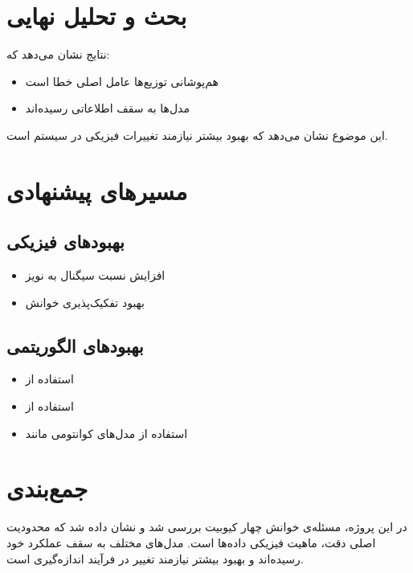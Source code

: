 \section{بحث و تحلیل نهایی}

نتایج نشان می‌دهد که:
\begin{itemize}
	\item هم‌پوشانی توزیع‌ها عامل اصلی خطا است
	\item مدل‌ها به سقف اطلاعاتی رسیده‌اند
\end{itemize}

این موضوع نشان می‌دهد که بهبود بیشتر نیازمند تغییرات فیزیکی در سیستم است.

\section{مسیرهای پیشنهادی}

\subsection{بهبودهای فیزیکی}
\begin{itemize}
	\item افزایش نسبت سیگنال به نویز
	\item بهبود تفکیک‌پذیری خوانش
\end{itemize}

\subsection{بهبودهای الگوریتمی}
\begin{itemize}
	\item استفاده از 
	\item استفاده از 
	\item استفاده از مدل‌های کوانتومی مانند 
\end{itemize}

\section{جمع‌بندی}

در این پروژه، مسئله‌ی خوانش چهار کیوبیت بررسی شد و نشان داده شد که محدودیت اصلی دقت، ماهیت فیزیکی داده‌ها است. مدل‌های مختلف به سقف عملکرد خود رسیده‌اند و بهبود بیشتر نیازمند تغییر در فرآیند اندازه‌گیری است.